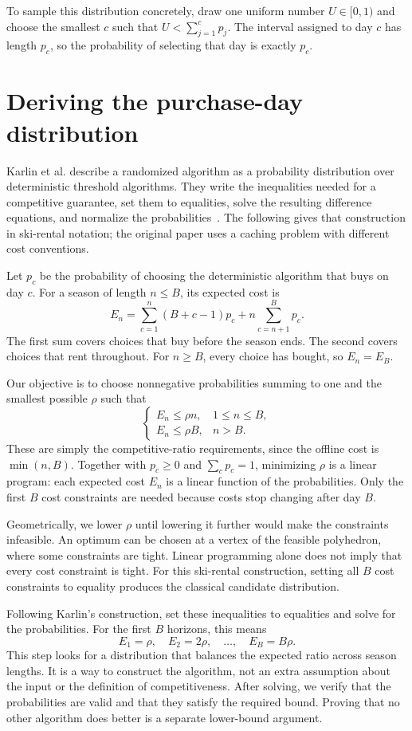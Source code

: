 \documentclass[11pt]{article}
\begin{document}
To sample this distribution concretely, draw one uniform number $U\in[0,1)$ and choose the smallest $c$ such that $U<\sum_{j=1}^{c}p_j$. The interval assigned to day $c$ has length $p_c$, so the probability of selecting that day is exactly $p_c$.

\section{Deriving the purchase-day distribution}
Karlin et al. describe a randomized algorithm as a probability distribution over deterministic threshold algorithms. They write the inequalities needed for a competitive guarantee, set them to equalities, solve the resulting difference equations, and normalize the probabilities~\cite{karlin}. The following gives that construction in ski-rental notation; the original paper uses a caching problem with different cost conventions.

Let $p_c$ be the probability of choosing the deterministic algorithm that buys on day $c$. For a season of length $n\le B$, its expected cost is
\[
E_n=\sum_{c=1}^n (B+c-1)p_c
+n\sum_{c=n+1}^B p_c.
\]
The first sum covers choices that buy before the season ends. The second covers choices that rent throughout. For $n\ge B$, every choice has bought, so $E_n=E_B$.

Our objective is to choose nonnegative probabilities summing to one and the smallest possible $\rho$ such that
\[
\begin{cases}
E_n\le\rho n,&1\le n\le B,\\
E_n\le\rho B,&n>B.
\end{cases}
\]
These are simply the competitive-ratio requirements, since the offline cost is $\min(n,B)$. Together with $p_c\ge0$ and $\sum_c p_c=1$, minimizing $\rho$ is a linear program: each expected cost $E_n$ is a linear function of the probabilities. Only the first $B$ cost constraints are needed because costs stop changing after day $B$.

Geometrically, we lower $\rho$ until lowering it further would make the constraints infeasible. An optimum can be chosen at a vertex of the feasible polyhedron, where some constraints are tight. Linear programming alone does not imply that every cost constraint is tight. For this ski-rental construction, setting all $B$ cost constraints to equality produces the classical candidate distribution.

Following Karlin's construction, set these inequalities to equalities and solve for the probabilities. For the first $B$ horizons, this means
\[
E_1=\rho,\quad E_2=2\rho,\quad\ldots,\quad E_B=B\rho.
\]
This step looks for a distribution that balances the expected ratio across season lengths. It is a way to construct the algorithm, not an extra assumption about the input or the definition of competitiveness. After solving, we verify that the probabilities are valid and that they satisfy the required bound. Proving that no other algorithm does better is a separate lower-bound argument.
\end{document}
